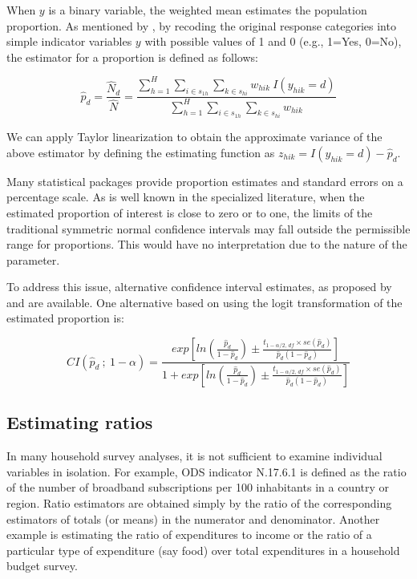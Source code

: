 \documentclass[
  12pt,
]{book}
\begin{document}
When \(y\) is a binary variable, the weighted mean estimates the population proportion. As mentioned by \citet{Heeringa2017}, by recoding the original response categories into simple indicator variables \(y\) with possible values of 1 and 0 (e.g., 1=Yes, 0=No), the estimator for a proportion is defined as follows:

\[
\widehat{p}_d = \frac{\widehat{N}_d}{\widehat{N}} = \frac{\sum_{h=1}^{H}\sum_{i \in s_{1h}} \sum_{ k \in s_{hi}} w_{hik}\ I(y_{hik} = d)} {\sum_{h=1}^{H}\sum_{i \in s_{1h}} \sum_{ k \in s_{hi}} w_{hik}}
\]

We can apply Taylor linearization to obtain the approximate variance of the above estimator by defining the estimating function as \(z_{hik} = I(y_{hik} = d) - \widehat{p}_d\).

Many statistical packages provide proportion estimates and standard errors on a percentage scale. As is well known in the specialized literature, when the estimated proportion of interest is close to zero or to one, the limits of the traditional symmetric normal confidence intervals may fall outside the permissible range for proportions. This would have no interpretation due to the nature of the parameter.

To address this issue, alternative confidence interval estimates, as proposed by \citet{Rust2007ConfidenceIF} and \citet{DeanPagano2015} are available. One alternative based on using the logit transformation of the estimated proportion is:

\[
CI \left( \widehat{p}_d \ ; \ 1 - \alpha \right) = \frac {exp \left[ ln \left( \frac{\widehat{p}_d} {1 - \widehat{p}_d} \right) \pm \frac{t_{1-\alpha/2 , \, df} \times se \left( \widehat{p}_d \right)} {\widehat{p}_d \left( 1 - \widehat{p}_d \right) } \right]} {1 + exp \left[ ln \left( \frac{\widehat{p}_d} {1 - \widehat{p}_d} \right) \pm \frac{t_{1-\alpha/2, \, df} \times se \left( \widehat{p}_d \right)} {\widehat{p}_d \left( 1 - \widehat{p}_d \right)}\right]}
\]

\hypertarget{estimating-ratios}{%
\subsection{Estimating ratios}\label{estimating-ratios}}

In many household survey analyses, it is not sufficient to examine individual variables in isolation. For example, ODS indicator N.17.6.1 is defined as the ratio of the number of broadband subscriptions per 100 inhabitants in a country or region. Ratio estimators are obtained simply by the ratio of the corresponding estimators of totals (or means) in the numerator and denominator. Another example is estimating the ratio of expenditures to income or the ratio of a particular type of expenditure (say food) over total expenditures in a household budget survey.
\end{document}
